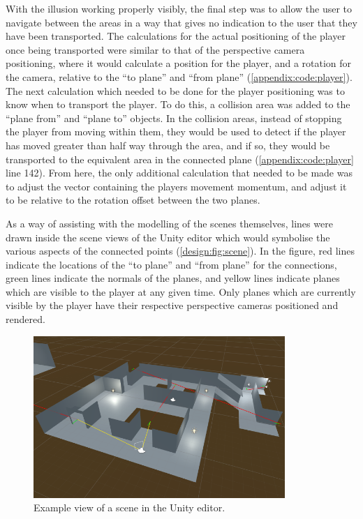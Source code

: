 		With the illusion working properly visibly, the final step was to allow the user to navigate between the areas in a way that gives no indication to the user that they have been transported.
		The calculations for the actual positioning of the player once being transported were similar to that of the perspective camera positioning, where it would calculate a position for the player, and a rotation for the camera, relative to the \enquote{to plane} and \enquote{from plane} (\autoref{appendix:code:player}).
		The next calculation which needed to be done for the player positioning was to know when to transport the player.
		To do this, a collision area was added to the \enquote{plane from} and \enquote{plane to} objects.
		In the collision areas, instead of stopping the player from moving within them, they would be used to detect if the player has moved greater than half way through the area, and if so, they would be transported to the equivalent area in the connected plane (\autoref{appendix:code:player} line 142).
		From here, the only additional calculation that needed to be made was to adjust the vector containing the players movement momentum, and adjust it to be relative to the rotation offset between the two planes.

		As a way of assisting with the modelling of the scenes themselves, lines were drawn inside the scene views of the Unity editor which would symbolise the various aspects of the connected points (\autoref{design:fig:scene}).
		In the figure, red lines indicate the locations of the \enquote{to plane} and \enquote{from plane} for the connections, green lines indicate the normals of the planes, and yellow lines indicate planes which are visible to the player at any given time.
		Only planes which are currently visible by the player have their respective perspective cameras positioned and rendered.

		\begin{figure}[H]
			\includegraphics[width=0.85\textwidth]{Images/Lines_Everywhere2}
			\centering
			\caption{Example view of a scene in the Unity editor.}
			\label{design:fig:scene}
		\end{figure}

